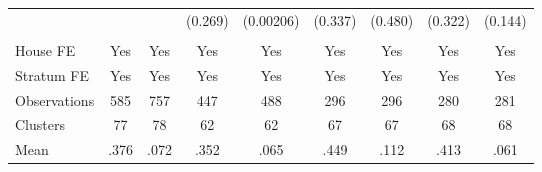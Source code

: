 {\begin{tabular}{l*{8}{c}}
                &         &         &  (0.269)&(0.00206)&  (0.337)&  (0.480)&  (0.322)&  (0.144)\\
                &         &         &         &         &         &         &         &         \\
House FE        &      Yes&      Yes&      Yes&      Yes&      Yes&      Yes&      Yes&      Yes\\
Stratum FE      &      Yes&      Yes&      Yes&      Yes&      Yes&      Yes&      Yes&      Yes\\
\midrule
Observations    &      585&      757&      447&      488&      296&      296&      280&      281\\
Clusters        &       77&       78&       62&       62&       67&       67&       68&       68\\
Mean            &     .376&     .072&     .352&     .065&     .449&     .112&     .413&     .061\\
\bottomrule
\end{tabular}
}
